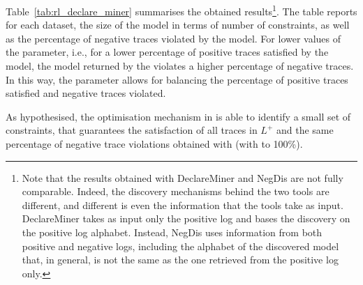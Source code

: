 Table~\ref{tab:rl_declare_miner} summarises the obtained results\footnote{Note that the results obtained with DeclareMiner and NegDis are not fully comparable. Indeed, the discovery mechanisms behind the two tools are different, and different is even the information that the tools take as input. DeclareMiner takes as input only the positive log and bases the discovery on the positive log alphabet. Instead, NegDis uses information from both positive and negative logs, including the alphabet of the discovered model that, in general, is not the same as the one retrieved from the positive log only.
}. The table reports for each dataset, the size of the model in terms of number of constraints, as well as the percentage of negative traces violated by the model. For lower values of the  parameter, i.e., for a lower percentage of positive traces satisfied by the model, the model returned by the \declareminer violates a higher percentage of negative traces. In this way, the  parameter allows for balancing the percentage of positive traces satisfied and negative traces violated. 

As hypothesised, the optimisation mechanism in \nd is able to identify a small set of constraints, that guarantees the satisfaction of all traces in $L^+$ and the same  percentage of negative trace violations obtained with \declareminer (with  to 100\%).

